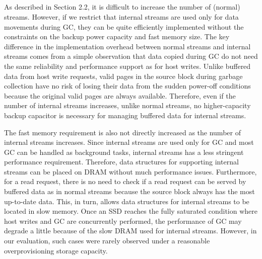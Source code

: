 \subsection{}
\vspace{-5pt}
As described in Section 2.2, it is difficult to increase the number of 
(normal) streams.  However, 
if we restrict that internal streams are used only for data movements
during GC,
they can be quite efficiently
implemented without the constraints on the backup power capacity and fast memory size.  
The key difference in the implementation overhead between normal streams and 
internal streams comes from a simple observation that data copied during 
GC do not need the same reliability and performance support as for host writes.  
Unlike buffered data from host write requests, valid pages in
the source block during garbage collection have no risk of losing their data 
from the sudden power-off conditions because the original valid pages are always available.    
Therefore, even if the
number of internal streams increases, unlike normal streams, 
no higher-capacity backup capacitor is necessary for managing buffered data for internal streams. 

The fast memory requirement is also not directly increased as the number 
of internal streams increases.   
Since internal streams are used only for GC and most GC can be handled as background tasks,
internal streams has a less stringent performance requirement.  
Therefore, data structures for supporting internal streams can be placed 
on DRAM without much performance issues.  
Furthermore, for a read request, there is no need to check if a read request 
can be served by buffered data as in normal streams because the source block always 
has the most up-to-date data.  
This, in turn, allows data structures for internal streams to be located in slow memory.
Once an SSD reaches the fully saturated condition where host writes and GC 
are concurrently performed, the performance of GC may degrade a little because of
the slow DRAM used for internal streams.   
However, in our evaluation, such cases were rarely observed under a 
reasonable overprovisioning storage capacity.

